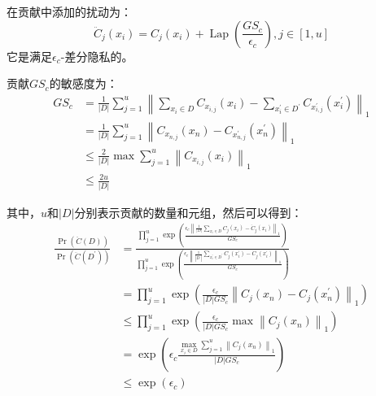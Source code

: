 在贡献中添加的扰动为：
\begin{equation}\label{eq:贡献中添加的噪声}
\ddot{C}_{j}\left(x_{i}\right)=C_{j}\left(x_{i}\right)+\operatorname{Lap}\left(\frac{G S_{c}}{\epsilon_{c}}\right), j \in[1, u]
\end{equation}
它是满足$\epsilon_{c}$-差分隐私的。

贡献$G S_{c}$的敏感度为：
\begin{equation}\label{eq:贡献敏感度}
\begin{aligned}
G S_{c} &=\frac{1}{|D|} \sum_{j=1}^{u}\left\|\sum_{x_{i} \in D} C_{x_{i, j}}\left(x_{i}\right)-\sum_{x_{i}^{\prime} \in D^{\prime}} C_{x_{i, j}^{\prime}}\left(x_{i}^{\prime}\right)\right\|_{1} \\
&=\frac{1}{|D|} \sum_{j=1}^{u}\left\|C_{x_{n, j}}\left(x_{n}\right)-C_{x_{n, j}^{\prime}}\left(x_{n}^{\prime}\right)\right\|_{1} \\
& \leq \frac{2}{|D|} \max \sum_{j=1}^{u}\left\|C_{x_{i, j}}\left(x_{i}\right)\right\|_{1} \\
& \leq \frac{2 u}{|D|}
\end{aligned}
\end{equation}

其中，$u$和$|D|$分别表示贡献的数量和元组，然后可以得到：
\begin{equation}\label{贡献数量和元组}
\begin{aligned}
\frac{\operatorname{Pr}(\ddot{C}(D))}{\operatorname{Pr}\left(\ddot{C}\left(D^{\prime}\right)\right)} &=\frac{\prod_{j=1}^{u} \exp \left(\frac{\epsilon_{c}\left\|\frac{1}{|D|} \sum_{x_{i} \in D} C_{j}\left(x_{i}\right)-\ddot{C}_{j}\left(x_{i}\right)\right\|_{1}}{G S_{c}}\right)}{\prod_{j=1}^{u} \exp \left(\frac{\epsilon_{c}\left\|\frac{1}{\left|D^{\prime}\right|} \sum_{x_{i}^{\prime} \in D^{\prime}} C_{j}\left(x_{i}^{\prime}\right)-\ddot{C}_{j}\left(x_{i}^{\prime}\right)\right\|_{1}}{G S_{c}}\right)} \\
&=\prod_{j=1}^{u} \exp \left(\frac{\epsilon_{c}}{|D| G S_{c}}\left\|C_{j}\left(x_{n}\right)-C_{j}\left(x_{n}^{\prime}\right)\right\|_{1}\right) \\
& \leq \prod_{j=1}^{u} \exp \left(\frac{\epsilon_{c}}{|D| G S_{c}} \max \left\|C_{j}\left(x_{n}\right)\right\|_{1}\right) \\
&=\exp \left(\epsilon_{c} \frac{\max _{x_{i} \in D} \sum_{j=1}^{u}\left\|C_{j}\left(x_{n}\right)\right\|_{1}}{|D| G S_{c}}\right) \\
& \leq \exp \left(\epsilon_{c}\right)
\end{aligned}
\end{equation}

